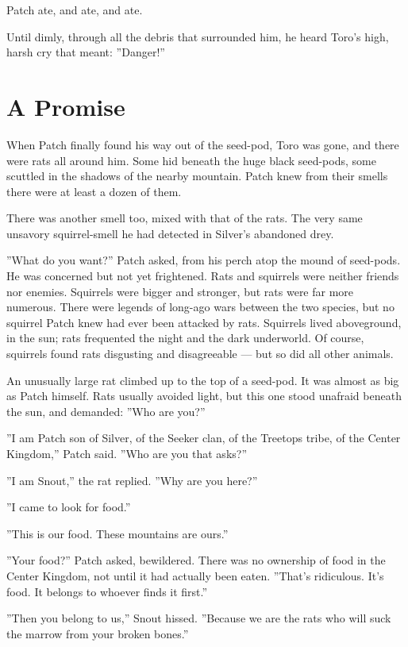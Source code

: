 \documentclass[12pt]{book}
\begin{document}
Patch ate, and ate, and ate.

Until dimly, through all the debris that surrounded him, he heard
Toro's high, harsh cry that meant: ''Danger!''


\section{A Promise}

When Patch finally found his way out of the seed-pod, Toro was gone,
and there were rats all around him. Some hid beneath the huge black
seed-pods, some scuttled in the shadows of the nearby mountain. Patch
knew from their smells there were at least a dozen of them.

There was another smell too, mixed with that of the rats. The very
same unsavory squirrel-smell he had detected in Silver's abandoned
drey.

''What do you want?'' Patch asked, from his perch atop the mound of
seed-pods. He was concerned but not yet frightened. Rats and squirrels
were neither friends nor enemies. Squirrels were bigger and stronger,
but rats were far more numerous. There were legends of long-ago wars
between the two species, but no squirrel Patch knew had ever been
attacked by rats. Squirrels lived aboveground, in the sun; rats
frequented the night and the dark underworld. Of course, squirrels
found rats disgusting and disagreeable --- but so did all other
animals.

An unusually large rat climbed up to the top of a seed-pod. It was
almost as big as Patch himself. Rats usually avoided light, but this
one stood unafraid beneath the sun, and demanded: ''Who are you?''

''I am Patch son of Silver, of the Seeker clan, of the Treetops tribe,
of the Center Kingdom,'' Patch said. ''Who are you that asks?''

''I am Snout,'' the rat replied. ''Why are you here?''

''I came to look for food.''

''This is our food. These mountains are ours.''

''Your food?'' Patch asked, bewildered. There was no ownership of food
in the Center Kingdom, not until it had actually been eaten. ''That's
ridiculous. It's food. It belongs to whoever finds it first.''

''Then you belong to us,'' Snout hissed. ''Because we are the rats who
will suck the marrow from your broken bones.''
\end{document}
